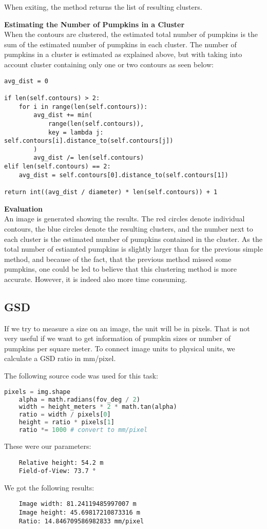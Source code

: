 \documentclass[../Head/Main.tex]{subfiles}
\begin{document}
When exiting, the method returns the list of resulting clusters.\par
\textbf{Estimating the Number of Pumpkins in a Cluster}\\
When the contours are clustered, the estimated total number of pumpkins is the sum of the estimated number of pumpkins in each cluster. The number of pumpkins in a cluster is estimated as explained above, but with taking into account cluster containing only one or two contours as seen below:
\begin{verbatim}
avg_dist = 0

if len(self.contours) > 2:
	for i in range(len(self.contours)):
    	avg_dist += min(
        	range(len(self.contours)),
            key = lambda j: self.contours[i].distance_to(self.contours[j])
        )
		avg_dist /= len(self.contours)
elif len(self.contours) == 2:
	avg_dist = self.contours[0].distance_to(self.contours[1])

return int((avg_dist / diameter) * len(self.contours)) + 1
\end{verbatim}
\textbf{Evaluation}\\
An image is generated showing the results. The red circles denote individual contours, the blue circles denote the resulting clusters, and the number next to each cluster is the estimated number of pumpkins contained in the cluster. As the total number of estiamted pumpkins is slightly larger than for the previous simple method, and because of the fact, that the previous method missed some pumpkins, one could be led to believe that this clustering method is more accurate. However, it is indeed also more time consuming.

\subsection{GSD}\label{subsec:gsd}

If we try to measure a size on an image, the unit will be in pixels. That is not very useful if we want to get information of pumpkin sizes or number of pumpkins per square meter. To connect image units to physical units, we calculate a GSD ratio in mm/pixel.

The following source code was used for this task:

\begin{lstlisting}[language=Python]
    pixels = img.shape
    alpha = math.radians(fov_deg / 2)
    width = height_meters * 2 * math.tan(alpha)
    ratio = width / pixels[0]
    height = ratio * pixels[1]
    ratio *= 1000 # convert to mm/pixel
\end{lstlisting}

These were our parameters:

\begin{verbatim}
    Relative height: 54.2 m
    Field-of-View: 73.7 °
\end{verbatim}


We got the following results:

\begin{verbatim}
    Image width: 81.24119485997007 m
    Image height: 45.69817210873316 m
    Ratio: 14.846709586982833 mm/pixel
\end{verbatim}
\end{document}

